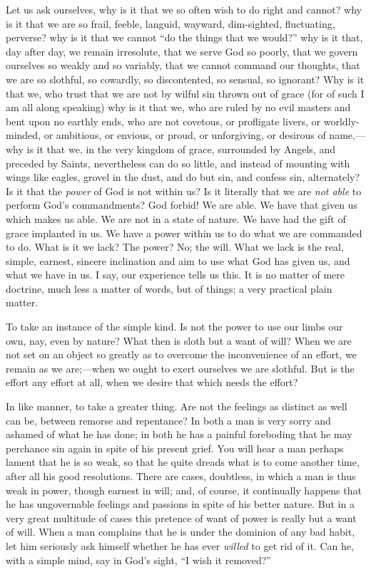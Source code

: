 Let us ask ourselves, why is it that we so often wish to do right
and cannot? why is it that we are so frail, feeble, languid, wayward,
dim-sighted, fluctuating, perverse? why is it that we cannot ``do
the things that we would?'' why is it that, day after day, we
remain irresolute, that we serve God so poorly, that we govern
ourselves so weakly and so variably, that we cannot command our
thoughts, that we are so slothful, so cowardly, so discontented, so
sensual, so ignorant? Why is it that we, who trust that we are not by
wilful sin thrown out of grace (for of such I am all along speaking)
why is it that we, who are ruled by no evil masters and bent upon no
earthly ends, who are not covetous, or profligate livers, or
worldly-minded, or ambitious, or envious, or proud, or unforgiving, or
desirous of name,—why is it that we, in the very kingdom of grace,
surrounded by Angels, and preceded by Saints, nevertheless can do so
little, and instead of mounting with wings like eagles, grovel in the
dust, and do but sin, and confess sin, alternately? Is it that the \emph{power}
of God is not within us? Is it literally that we are \emph{not able}
to perform God's commandments? God forbid! We are able. We have that
given us which makes us able. We are not in a state of nature. We have
had the gift of grace implanted in us. We have a power within us to do
what we are commanded to do. What is it we lack? The power? No; the
will. What we lack is the real, simple, earnest, sincere inclination
and aim to use what God has given us, and what we have in us. I say,
our experience tells us this. It is no matter of mere doctrine, much
less a matter of words, but of things; a very practical plain matter.

To take an instance of the simple kind. Is not the power to use our
limbs our own, nay, even by nature? What then is sloth but a want of
will? When we are not set on an object so greatly as to overcome the
inconvenience of an effort, we remain as we are;—when we ought to
exert ourselves we are slothful. But is the effort any effort at all,
when we desire that which needs the effort?

In like manner, to take a greater thing. Are not the feelings as
distinct as well can be, between remorse and repentance? In both a man
is very sorry and ashamed of what he has done; in both he has a
painful foreboding that he may perchance sin again in spite of his
present grief. You will hear a man perhaps lament that he is so weak,
so that he quite dreads what is to come another time, after all his
good resolutions. There are cases, doubtless, in which a man is thus
weak in power, though earnest in will; and, of course, it continually
happens that he has ungovernable feelings and passions in spite of his
better nature. But in a very great multitude of cases this pretence of
want of power is really but a want of will. When a man complains that
he is under the dominion of any bad habit, let him seriously ask
himself whether he has ever \emph{willed} to get rid of it. Can he,
with a simple mind, say in God's sight, ``I wish it removed?''

